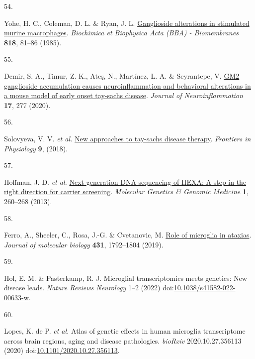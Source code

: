 \documentclass[
]{report}
\newlength{\cslhangindent}
\newlength{\csllabelwidth}
\newenvironment{CSLReferences}[2] %
 {\begin{list}{}{%
  \setlength{\itemindent}{0pt}
  \setlength{\leftmargin}{0pt}
  \setlength{\parsep}{0pt}
  \ifodd #1
   \setlength{\leftmargin}{\cslhangindent}
   \setlength{\itemindent}{-1\cslhangindent}
  \fi
  \setlength{\itemsep}{#2\baselineskip}}}
 {\end{list}}
\newcommand{\CSLLeftMargin}[1]{\parbox[t]{\csllabelwidth}{\strut#1\strut}}
\newcommand{\CSLRightInline}[1]{\parbox[t]{\linewidth - \csllabelwidth}{\strut#1\strut}}
\begin{document}
\begin{CSLReferences}{0}{0}
\CSLLeftMargin{54. }%
\CSLRightInline{Yohe, H. C., Coleman, D. L. \& Ryan, J. L.
\href{https://doi.org/10.1016/0005-2736(85)90141-5}{Ganglioside
alterations in stimulated murine macrophages}. \emph{Biochimica et
Biophysica Acta (BBA) - Biomembranes} \textbf{818}, 81--86 (1985).}

\CSLLeftMargin{55. }%
\CSLRightInline{Demir, S. A., Timur, Z. K., Ateş, N., Martínez, L. A. \&
Seyrantepe, V. \href{https://doi.org/10.1186/s12974-020-01947-6}{GM2
ganglioside accumulation causes neuroinflammation and behavioral
alterations in a mouse model of early onset tay-sachs disease}.
\emph{Journal of Neuroinflammation} \textbf{17}, 277 (2020).}

\CSLLeftMargin{56. }%
\CSLRightInline{Solovyeva, V. V. \emph{et al.}
\href{https://doi.org/10.3389/fphys.2018.01663}{New approaches to
tay-sachs disease therapy}. \emph{Frontiers in Physiology} \textbf{9},
(2018).}

\CSLLeftMargin{57. }%
\CSLRightInline{Hoffman, J. D. \emph{et al.}
\href{https://doi.org/10.1002/mgg3.37}{Next-generation DNA sequencing of
HEXA: A step in the right direction for carrier screening}.
\emph{Molecular Genetics \& Genomic Medicine} \textbf{1}, 260--268
(2013).}

\CSLLeftMargin{58. }%
\CSLRightInline{Ferro, A., Sheeler, C., Rosa, J.-G. \& Cvetanovic, M.
\href{https://doi.org/10.1016/j.jmb.2019.01.016}{Role of microglia in
ataxias}. \emph{Journal of molecular biology} \textbf{431}, 1792--1804
(2019).}

\CSLLeftMargin{59. }%
\CSLRightInline{Hol, E. M. \& Pasterkamp, R. J. Microglial
transcriptomics meets genetics: New disease leads. \emph{Nature Reviews
Neurology} 1--2 (2022)
doi:\href{https://doi.org/10.1038/s41582-022-00633-w}{10.1038/s41582-022-00633-w}.}

\CSLLeftMargin{60. }%
\CSLRightInline{Lopes, K. de P. \emph{et al.} Atlas of genetic effects
in human microglia transcriptome across brain regions, aging and disease
pathologies. \emph{bioRxiv} 2020.10.27.356113 (2020)
doi:\href{https://doi.org/10.1101/2020.10.27.356113}{10.1101/2020.10.27.356113}.}


\end{CSLReferences}
\end{document}
